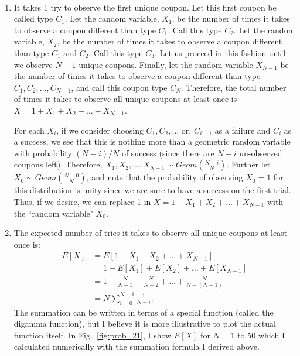 \begin{problem}{21} $ $

\begin{enumerate}
\item It takes 1 try to observe the first unique coupon.  Let this first coupon be called type $C_1$.  Let the random variable, $X_1$, be the number of times it takes to observe a coupon different than type $C_1$.  Call this type $C_2$.  Let the random variable, $X_2$, be the number of times it takes to observe a coupon different than type $C_1$ and $C_2$.  Call this type $C_3$.  Let us proceed in this fashion until we observe $N-1$ unique coupons.  Finally, let the random variable $X_{N-1}$ be the number of times it takes to observe a coupon different than type $C_1, C_2, \ldots, C_{N-1}$, and call this coupon type $C_N$.  Therefore, the total number of times it takes to observe all unique coupons at least once is $X=1+X_1+X_2+\ldots+X_{N-1}$.

For each $X_i$, if we consider choosing $C_1, C_2, \ldots$ or, $C_{i-1}$ as a failure and $C_{i}$ as a success, we see that this is nothing more than a geometric random variable with probability $(N-i)/N$ of success (since there are $N-i$ un-observed coupons left).  Therefore, $X_1, X_2, \ldots, X_{N-1} \sim Geom(\frac{N-i}{N})$.  Further let $X_0 \sim Geom(\frac{N-0}{N})$, and note that the probability of observing $X_0=1$ for this distribution is unity since we are sure to have a success on the first trial.  Thus, if we desire, we can replace 1 in $X=1+X_1+X_2+\ldots+X_{N-1}$ with the ``random variable" $X_0$.

\item
The expected number of tries it takes to observe all unique coupons at least once is:
\begin{align*}
E[X]&=E[1+X_1+X_2+\ldots+X_{N-1}]\\
&=1+E[X_1]+E[X_2]+\ldots+E[X_{N-1}]\\
& = 1+ \frac{N}{N-1}+\frac{N}{N-2}+\ldots+\frac{N}{N-(N-1)} \\
& = N\sum_{i=0}^{N-1}\frac{1}{N-i}.
\end{align*}
The summation can be written in terms of a special function (called the digamma function), but I believe it is more illustrative to plot the actual function itself.  In Fig.~\ref{fig:prob_21}, I show $E[X]$ for $N=1$ to 50 which I calculated numerically with the summation formula I derived above.


\end{enumerate}
\end{problem}
